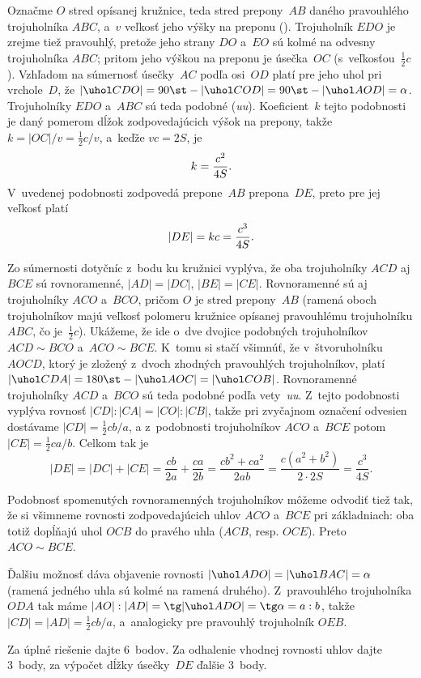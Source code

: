 {%
Označme $O$ stred opísanej kružnice, teda stred prepony~$AB$ daného pravouhlého trojuholníka $ABC$, a~$v$ veľkosť jeho výšky na preponu (\obr).
%
Trojuholník $EDO$ je zrejme tiež pravouhlý, pretože jeho strany $DO$ a~$EO$ sú kolmé na odvesny trojuholníka $ABC$; pritom jeho výškou na preponu je úsečka~$OC$ (s~veľkosťou~$\frac12c$). Vzhľadom na súmernosť úsečky~$AC$ podľa osi~$OD$
platí pre jeho uhol pri vrchole~$D$, že $|\uhol CDO|=90\st-|\uhol COD|=90\st-|\uhol AOD|=\alpha$.
Trojuholníky $EDO$ a~$ABC$ sú teda podobné ({\it uu\/}). Koeficient~$k$ tejto podobnosti je daný pomerom dĺžok %
zodpovedajúcich výšok na prepony, takže $k=|OC|/v=\frac12c/v$,
a~keďže $vc=2S$, je
$$
k={c^2\over4S}.
$$
V~uvedenej podobnosti zodpovedá prepone~$AB$ prepona~$DE$, preto pre jej veľkosť platí
$$
|DE|=kc={c^3\over4S}.
$$

\ineriesenie
Zo súmernosti dotyčníc z~bodu ku kružnici vyplýva, že oba trojuholníky $ACD$ aj $BCE$ sú rovnoramenné, $|AD|=|DC|$, $|BE|=|CE|$. Rovnoramenné sú aj trojuholníky $ACO$ a~$BCO$, pričom $O$ je stred prepony~$AB$ (ramená oboch trojuholníkov majú veľkosť polomeru kružnice opísanej pravouhlému trojuholníku $ABC$, čo je~$\frac12c$). Ukážeme, že ide o~dve dvojice podobných trojuholníkov $ACD\sim BCO$ a~$ACO\sim BCE$. K~tomu si stačí všimnúť, že v~štvoruholníku $AOCD$, ktorý je zložený z~dvoch zhodných pravouhlých trojuholníkov, platí $|\uhol CDA|=180\st-|\uhol AOC|=|\uhol COB|$. Rovnoramenné trojuholníky $ACD$ a~$BCO$ sú teda podobné podľa vety~{\it uu}. Z~tejto podobnosti vyplýva rovnosť $|CD|:|CA|=|CO|:|CB|$, takže pri zvyčajnom označení odvesien dostávame $|CD|=\frac12cb/a$, a z~podobnosti trojuholníkov $ACO$ a~$BCE$ potom $|CE|=\frac12{ca/b}$. Celkom tak je
$$
|DE|=|DC|+|CE|=\frac{cb}{2a}+\frac{ca}{2b}=\frac{cb^2+ca^2}{2ab}=
\frac{c(a^2+b^2)}{2\cdot2S}=\frac{c^3}{4S}.
$$

\poznamky
Podobnosť spomenutých rovnoramenných trojuholníkov môžeme odvodiť tiež tak, že si všimneme rovnosti zodpovedajúcich uhlov $ACO$ a~$BCE$ pri základniach: oba totiž dopĺňajú uhol $OCB$ do pravého uhla ($ACB$, resp. $OCE$). Preto $ACO\sim BCE$.

Ďalšiu možnosť dáva objavenie rovnosti $|\uhol ADO|=|\uhol BAC|=\alpha$ (ramená jedného uhla sú kolmé na ramená druhého). Z~pravouhlého trojuholníka $ODA$ tak máme $|AO|:|AD|=\tg|\uhol ADO|=\tg\alpha=a:b$, takže
$|CD|=|AD|=\frac12cb/a$, a~analogicky pre pravouhlý trojuholník $OEB$.

\nobreak\medskip\petit\noindent
Za úplné riešenie dajte 6~bodov. Za odhalenie vhodnej rovnosti uhlov dajte 3~body, za výpočet dĺžky úsečky~$DE$ ďalšie 3~body.
\endpetit
\bigbreak}

